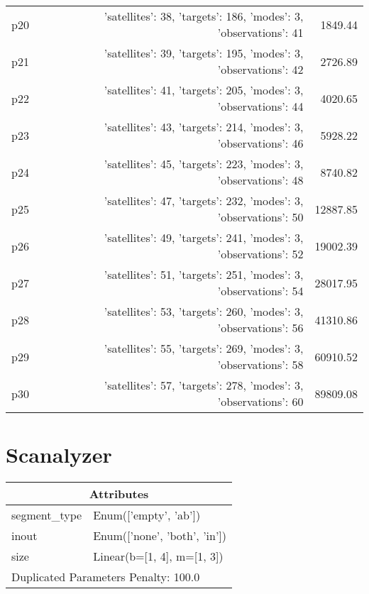 \documentclass{article}
\begin{document}
\begin{center}
\begin{tabular}{@{}l|r|r@{}}
  p20&{'satellites': 38, 'targets': 186, 'modes': 3, 'observations': 41}&1849.44\\
  p21&{'satellites': 39, 'targets': 195, 'modes': 3, 'observations': 42}&2726.89\\
  p22&{'satellites': 41, 'targets': 205, 'modes': 3, 'observations': 44}&4020.65\\
  p23&{'satellites': 43, 'targets': 214, 'modes': 3, 'observations': 46}&5928.22\\
  p24&{'satellites': 45, 'targets': 223, 'modes': 3, 'observations': 48}&8740.82\\
  p25&{'satellites': 47, 'targets': 232, 'modes': 3, 'observations': 50}&12887.85\\
  p26&{'satellites': 49, 'targets': 241, 'modes': 3, 'observations': 52}&19002.39\\
  p27&{'satellites': 51, 'targets': 251, 'modes': 3, 'observations': 54}&28017.95\\
  p28&{'satellites': 53, 'targets': 260, 'modes': 3, 'observations': 56}&41310.86\\
  p29&{'satellites': 55, 'targets': 269, 'modes': 3, 'observations': 58}&60910.52\\
  p30&{'satellites': 57, 'targets': 278, 'modes': 3, 'observations': 60}&89809.08
                            \end{tabular}
                            \end{center}
                    
                            \newpage \section{Scanalyzer}
                    \begin{center}
                    \begin{tabular}{@{}p{}p{}@{}}
                    \multicolumn{2}{c}{\bf \large Attributes}\\\midrule
                    segment\_type & Enum(['empty', 'ab'])\\
inout & Enum(['none', 'both', 'in'])\\
size & Linear(b=[1, 4], m=[1, 3]) \\\midrule
                    \multicolumn{2}{l}{Duplicated Parameters Penalty: 100.0}
                    \end{tabular}
                    \end{center}
                
\end{document}
